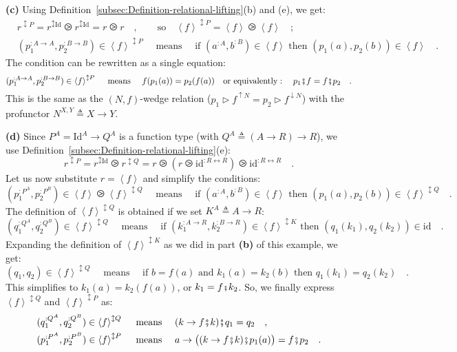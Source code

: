 \textbf{(c)} Using Definition~\ref{subsec:Definition-relational-lifting}(b)
and (e), we get:
\begin{align*}
 & r^{\updownarrow P}=r^{\updownarrow\text{Id}}\ogreaterthan r^{\updownarrow\text{Id}}=r\ogreaterthan r\quad,\quad\quad\text{so}\quad\left<f\right>^{\updownarrow P}=\left<f\right>\ogreaterthan\left<f\right>\quad;\\
 & (p_{1}^{:A\rightarrow A},p_{2}^{:B\rightarrow B})\in\left<f\right>^{\updownarrow P}\quad\text{ means }\quad\text{if }(a^{:A},b^{:B})\in\left<f\right>\text{ then }(p_{1}(a),p_{2}(b))\in\left<f\right>\quad.
\end{align*}
The condition can be rewritten as a single equation:
\[
(p_{1}^{:A\rightarrow A},p_{2}^{:B\rightarrow B})\in\left<f\right>^{\updownarrow P}\quad\text{ means }\quad f(p_{1}(a))=p_{2}(f(a))\quad\text{or equivalently}:\quad p_{1}\bef f=f\bef p_{2}\quad.
\]
This is the same as the $\left(N,f\right)$-wedge relation ($p_{1}\triangleright f^{\uparrow N}=p_{2}\triangleright f^{\downarrow N}$)
with the profunctor $N^{X,Y}\triangleq X\rightarrow Y$.

\textbf{(d)} Since $P^{A}=\text{Id}^{A}\rightarrow Q^{A}$ is a function
type (with $Q^{A}\triangleq\left(A\rightarrow R\right)\rightarrow R$),
we use Definition~\ref{subsec:Definition-relational-lifting}(e):
\[
r^{\updownarrow P}=r^{\updownarrow\text{Id}}\ogreaterthan r^{\updownarrow Q}=r\ogreaterthan(r\ogreaterthan\text{id}^{:R\leftrightarrow R})\ogreaterthan\text{id}^{:R\leftrightarrow R}\quad.
\]
Let us now substitute $r=\left<f\right>$ and simplify the conditions:
\[
(p_{1}^{:P^{A}},p_{2}^{:P^{B}})\in\left<f\right>\ogreaterthan\left<f\right>^{\updownarrow Q}\quad\text{ means }\quad\text{if }(a^{:A},b^{:B})\in\left<f\right>\text{ then }(p_{1}(a),p_{2}(b))\in\left<f\right>^{\updownarrow Q}\quad.
\]
The definition of $\left<f\right>^{\updownarrow Q}$ is obtained if
we set $K^{A}\triangleq A\rightarrow R$:
\[
(q_{1}^{:Q^{A}},q_{2}^{:Q^{B}})\in\left<f\right>^{\updownarrow Q}\quad\text{ means }\quad\text{if }(k_{1}^{:A\rightarrow R},k_{2}^{:B\rightarrow R})\in\left<f\right>^{\updownarrow K}\text{ then }(q_{1}(k_{1}),q_{2}(k_{2}))\in\text{id}\quad.
\]
Expanding the definition of $\left<f\right>^{\updownarrow K}$ as
we did in part \textbf{(b)} of this example, we get:
\[
(q_{1},q_{2})\in\left<f\right>^{\updownarrow Q}\quad\text{ means }\quad\text{if }b=f(a)\text{ and }k_{1}(a)=k_{2}(b)\text{ then }q_{1}(k_{1})=q_{2}(k_{2})\quad.
\]
This simplifies to $k_{1}(a)=k_{2}(f(a))$, or $k_{1}=f\bef k_{2}$.
So, we finally express $\left<f\right>^{\updownarrow Q}$ and $\left<f\right>^{\updownarrow P}$
as:
\begin{align*}
 & (q_{1}^{:Q^{A}},q_{2}^{:Q^{B}})\in\left<f\right>^{\updownarrow Q}\quad\text{ means }\quad(k\rightarrow f\bef k)\bef q_{1}=q_{2}\quad,\\
 & (p_{1}^{:P^{A}},p_{2}^{:P^{B}})\in\left<f\right>^{\updownarrow P}\quad\text{ means }\quad a\rightarrow\big((k\rightarrow f\bef k)\bef p_{1}(a)\big)=f\bef p_{2}\quad.
\end{align*}

